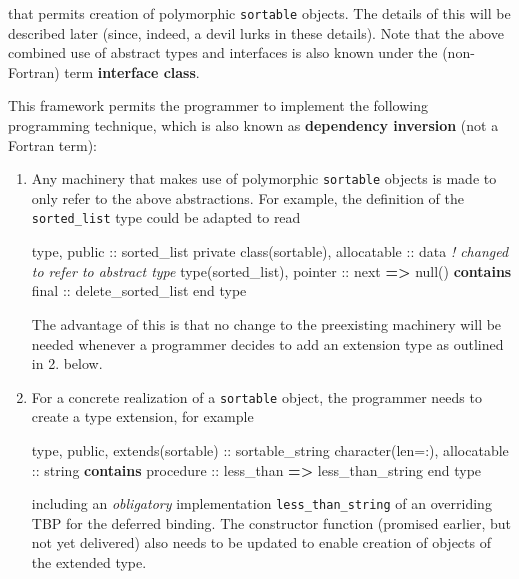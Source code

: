 \documentclass[
  paper=a4,
  ,captions=tableheading
]{scrartcl}
\newenvironment{Shaded}{\begin{snugshade}}{\end{snugshade}}
\newcommand{\CommentTok}[1]{\textcolor[rgb]{0.56,0.35,0.01}{\textit{#1}}}
\newcommand{\DataTypeTok}[1]{\textcolor[rgb]{0.13,0.29,0.53}{#1}}
\newcommand{\KeywordTok}[1]{\textcolor[rgb]{0.13,0.29,0.53}{\textbf{#1}}}
\newcommand{\NormalTok}[1]{#1}
\newcommand{\OperatorTok}[1]{\textcolor[rgb]{0.81,0.36,0.00}{\textbf{#1}}}
\begin{document}
that permits creation of polymorphic \texttt{sortable} objects. The
details of this will be described later (since, indeed, a devil lurks in
these details). Note that the above combined use of abstract types and
interfaces is also known under the (non-Fortran) term \textbf{interface
class}.

This framework permits the programmer to implement the following
programming technique, which is also known as \textbf{dependency
inversion} (not a Fortran term):

\begin{enumerate}
\def\labelenumi{\arabic{enumi}.}
\item
  Any machinery that makes use of polymorphic \texttt{sortable} objects
  is made to only refer to the above abstractions. For example, the
  definition of the \texttt{sorted\_list} type could be adapted to read

\begin{Shaded}
\begin{Highlighting}[]
\DataTypeTok{type}\NormalTok{, }\DataTypeTok{public} \DataTypeTok{::}\NormalTok{ sorted\_list}
  \DataTypeTok{private}
  \DataTypeTok{class(sortable)}\NormalTok{, }\DataTypeTok{allocatable} \DataTypeTok{::}\NormalTok{ data}
  \CommentTok{! changed to refer to abstract type}
  \DataTypeTok{type(sorted\_list)}\NormalTok{, }\DataTypeTok{pointer} \DataTypeTok{::}\NormalTok{ next }\KeywordTok{=}\OperatorTok{\textgreater{}}\NormalTok{ null()}
\KeywordTok{contains}
  \DataTypeTok{final} \DataTypeTok{::}\NormalTok{ delete\_sorted\_list}
\DataTypeTok{end type}
\end{Highlighting}
\end{Shaded}

  The advantage of this is that no change to the preexisting machinery
  will be needed whenever a programmer decides to add an extension type
  as outlined in 2. below.
\item
  For a concrete realization of a \texttt{sortable} object, the
  programmer needs to create a type extension, for example

\begin{Shaded}
\begin{Highlighting}[]
\DataTypeTok{type}\NormalTok{, }\DataTypeTok{public}\NormalTok{, }\DataTypeTok{extends(sortable)} \DataTypeTok{::}\NormalTok{ sortable\_string}
  \DataTypeTok{character(len=:)}\NormalTok{, }\DataTypeTok{allocatable} \DataTypeTok{::}\NormalTok{ string}
\KeywordTok{contains}
  \DataTypeTok{procedure} \DataTypeTok{::}\NormalTok{ less\_than }\KeywordTok{=}\OperatorTok{\textgreater{}}\NormalTok{ less\_than\_string}
\DataTypeTok{end type}
\end{Highlighting}
\end{Shaded}

  including an \emph{obligatory} implementation
  \texttt{less\_than\_string} of an overriding TBP for the deferred
  binding. The constructor function (promised earlier, but not yet
  delivered) also needs to be updated to enable creation of objects of
  the extended type.
\end{enumerate}
\end{document}
